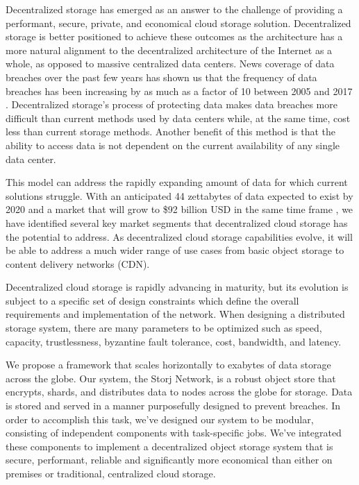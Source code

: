 \documentclass[8pt,fleqn,openany]{book}
\begin{document}
Decentralized storage has emerged as an answer to the challenge of
providing a performant, secure, private, and economical cloud storage solution.
Decentralized storage is better positioned to achieve these outcomes as the
architecture has a more natural alignment to the decentralized architecture of
the Internet as a whole, as opposed to massive centralized data centers.
News coverage of data breaches over the past few years has shown us that the
frequency of data breaches has been increasing by as much as a factor of 10
between 2005 and 2017 \cite{breaches}.
Decentralized storage's process of protecting data makes data breaches more
difficult than current methods used by data centers while, at the same time,
cost less than current storage methods. Another benefit of this method is that
the ability to access data is not dependent on the current availability of any
single data center.

This model can address the rapidly
expanding amount of data for which current solutions struggle.
With an anticipated 44 zettabytes of data expected to exist by 2020 and a
market that will grow to \$92 billion USD in the same time frame
\cite{storage-growth}, we have identified several key market segments that decentralized cloud storage
has the potential to address.
As decentralized cloud storage capabilities evolve, it will be able to address a much wider range of use cases from basic
object storage to content delivery networks (CDN).

Decentralized cloud storage is rapidly advancing in maturity, but its evolution
is subject to a specific set of design constraints which
define the overall requirements and implementation of
the network. When designing a distributed storage system,
there are many parameters to be optimized such as speed, capacity,
trustlessness, byzantine fault tolerance, cost, bandwidth, and latency.

We propose a framework that scales horizontally to exabytes of data storage across the globe. Our system, the Storj Network, is a robust object store
that encrypts, shards, and distributes data to nodes across the globe for
storage.
Data is stored and served in a manner purposefully designed to prevent
breaches.
In order to accomplish this task, we've designed our system to be modular,
consisting of independent components with task-specific jobs.
We've integrated these components to implement a decentralized object storage
system that is secure, performant, reliable and significantly more economical than either on premises or traditional, centralized cloud storage.
\end{document}
